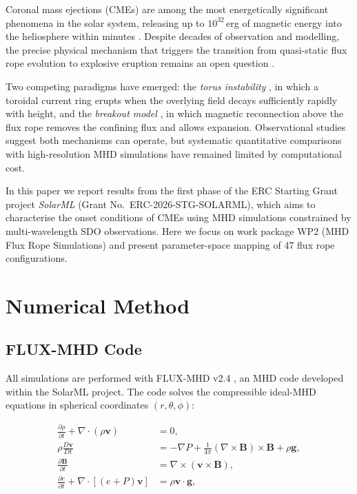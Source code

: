 \documentclass[twocolumn]{aastex631}
\begin{document}
Coronal mass ejections (CMEs) are among the most energetically significant phenomena
in the solar system, releasing up to $10^{32}$\,erg of magnetic energy into the
heliosphere within minutes \citep{Forbes2000}. Despite decades of observation and
modelling, the precise physical mechanism that triggers the transition from quasi-static
flux rope evolution to explosive eruption remains an open question \citep{Schmieder2015}.

Two competing paradigms have emerged: the \textit{torus instability} \citep{Kliem2006},
in which a toroidal current ring erupts when the overlying field decays sufficiently
rapidly with height, and the \textit{breakout model} \citep{Antiochos1999}, in which
magnetic reconnection above the flux rope removes the confining flux and allows
expansion. Observational studies \citep{Zuccarello2015, Baumgartner2018} suggest both
mechanisms can operate, but systematic quantitative comparisons with high-resolution
MHD simulations have remained limited by computational cost.

In this paper we report results from the first phase of the ERC Starting Grant
project \textit{SolarML} (Grant No.~ERC-2026-STG-SOLARML), which aims to
characterise the onset conditions of CMEs using MHD simulations constrained by
multi-wavelength SDO observations. Here we focus on work package WP2 (MHD Flux
Rope Simulations) and present parameter-space mapping of 47 flux rope configurations.

\section{Numerical Method}
\label{sec:method}

\subsection{FLUX-MHD Code}
\label{sec:code}

All simulations are performed with \textsc{FLUX-MHD} v2.4 \citep{AsanteCtvrtecka2025},
an MHD code developed within the SolarML project. The code solves the compressible
ideal-MHD equations in spherical coordinates $(r, \theta, \phi)$:

\begin{align}
\frac{\partial \rho}{\partial t} + \nabla \cdot (\rho \mathbf{v}) &= 0, \label{eq:cont}\\
\rho \frac{D\mathbf{v}}{Dt} &= -\nabla P + \frac{1}{4\pi}(\nabla \times \mathbf{B}) \times \mathbf{B} + \rho \mathbf{g}, \label{eq:mom}\\
\frac{\partial \mathbf{B}}{\partial t} &= \nabla \times (\mathbf{v} \times \mathbf{B}), \label{eq:ind}\\
\frac{\partial e}{\partial t} + \nabla \cdot \left[(e+P)\mathbf{v}\right] &= \rho \mathbf{v} \cdot \mathbf{g}, \label{eq:energy}
\end{align}
\end{document}
